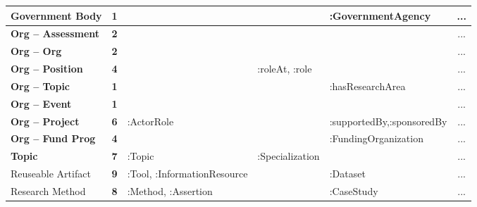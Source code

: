 \begin{table}[H]
\begin{tabular}{|p{2.8cm}|c|p{2.6cm}|p{2.2cm}|p{3cm}|c|}
Government Body             & \cellcolor[HTML]{F98971}\textbf{1} &                                             &                           & :GovernmentAgency                                 & ... \\ \hline
\textbf{Org -- Assessment}  & \cellcolor[HTML]{FBAA77}\textbf{2} &                                             &                           &                                                   & ... \\ \hline
\textbf{Org -- Org}        & \cellcolor[HTML]{FBAA77}\textbf{2} &                                             &                           &                                                   & ... \\ \hline
\textbf{Org -- Position}    & \cellcolor[HTML]{FFEB84}\textbf{4} &                                             & :roleAt, :role            &                                                   & ... \\ \hline
\textbf{Org -- Topic}       & \cellcolor[HTML]{F98971}\textbf{1} &                                             &                           & :hasResearchArea                                  & ... \\ \hline
\textbf{Org -- Event}       & \cellcolor[HTML]{F98971}\textbf{1} &                                             &                           &                                                   & ... \\ \hline
\textbf{Org -- Project}     & \cellcolor[HTML]{FFEB84}\textbf{6} & :ActorRole                                  &                           & :supportedBy,\newline :sponsoredBy                        & ... \\ \hline
\textbf{Org -- Fund Prog} & \cellcolor[HTML]{FFEB84}\textbf{4} &                                             &                           & :FundingOrganization                              & ... \\ \hline \hline
\textbf{Topic}              & \cellcolor[HTML]{E9E583}\textbf{7} & :Topic                                      & :Specialization           &                                                   & ... \\ \hline
Reuseable Artifact          & \cellcolor[HTML]{90CB7E}\textbf{9} & :Tool, :InformationResource                 &                           & :Dataset                                          & ... \\ \hline
Research Method             & \cellcolor[HTML]{A6D27F}\textbf{8} & :Method,  :Assertion                         &                           & :CaseStudy                                        & ... \\ \hline

\end{tabular}
\end{table}
